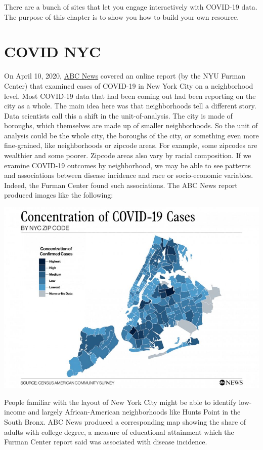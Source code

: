 \documentclass[openany]{book}
\begin{document}
There are a bunch of sites that let you engage interactively with COVID-19 data. The purpose of this chapter is to show you how to build your own resource.

\hypertarget{part1}{%
\section{COVID NYC}\label{part1}}

On April 10, 2020, \href{https://abcnews.go.com/Health/nyc-stark-contrast-covid-19-infection-rates-based/story?id=69920706}{ABC News} covered an online report (by the NYU Furman Center) that examined cases of COVID-19 in New York City on a neighborhood level. Most COVID-19 data that had been coming out had been reporting on the city as a whole. The main idea here was that neighborhoods tell a different story. Data scientists call this a shift in the unit-of-analysis. The city is made of boroughs, which themselves are made up of smaller neighborhoods. So the unit of analysis could be the whole city, the boroughs of the city, or something even more fine-grained, like neighborhoods or zipcode areas. For example, some zipcodes are wealthier and some poorer. Zipcode areas also vary by racial composition. If we examine COVID-19 outcomes by neighborhood, we may be able to see patterns and associations between disease incidence and race or socio-economic variables. Indeed, the Furman Center found such associations. The ABC News report produced images like the following:

\includegraphics{images/abc_COVID19NycZip_v03_KA_hpEmbed_17x12_992.jpg}

People familiar with the layout of New York City might be able to identify low-income and largely African-American neighborhoods like Hunts Point in the South Bronx. ABC News produced a corresponding map showing the share of adults with college degree, a measure of educational attainment which the Furman Center report said was associated with disease incidence.
\end{document}

